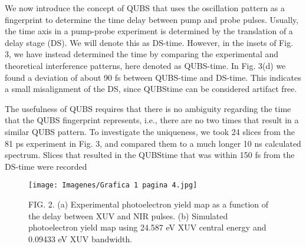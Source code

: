 \documentclass[7pt]{article}
\begin{document}
\begin{multicols}{2}
We now introduce the concept of QUBS that uses the oscillation pattern as a fingerprint to determine the time delay between pump and probe pulses. Usually, the time axis in a pump-probe experiment is determined by the translation of a
delay stage (DS). We will denote this as DS-time. However, in the insets of Fig. 3, we have instead determined the time by comparing the experimental and theoretical interference patterns, here denoted as QUBS-time. In Fig. 3(d) we found a deviation of about 90 fs between QUBS-time and DS-time. This indicates a small misalignment of the DS, since QUBStime can be considered artifact free.

The usefulness of QUBS requires that there is no ambiguity regarding the time that the QUBS fingerprint represents, i.e., there are no two times that result in a similar QUBS pattern. To investigate the uniqueness, we took 24 slices from the 81 ps experiment in Fig. 3, and compared them to a much longer 10 ns calculated spectrum. Slices that resulted in the QUBStime that was within 150 fs from the DS-time were recorded

\end{multicols}

\newpage
\fancyhead[C]{ } 
\fancyfoot[L]{}
\fancyfoot[R]{ }

\begin{figure}
    \centering
    \texttt{[image: Imagenes/Grafica 1 pagina 4.jpg]}
    \caption*{\small{FIG. 2. (a) Experimental photoelectron yield map as a function of the delay between XUV and NIR pulses. (b) Simulated photoelectron yield map using 24.587 eV XUV central energy and 0.09433 eV XUV bandwidth.
 }}
    \label{grafica 1 pagina 4}
\end{figure}
\end{document}
